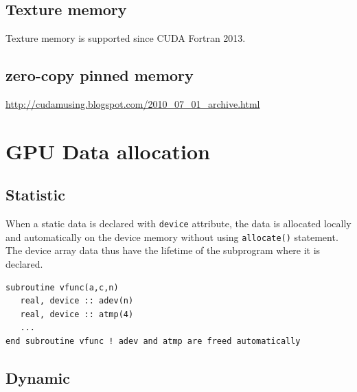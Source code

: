 \subsection{Texture memory}
\label{sec:cudafortran_texture}


Texture memory is supported since CUDA Fortran 2013. 



\subsection{zero-copy pinned memory}
\label{sec:cudaf_zero-copy}

\url{http://cudamusing.blogspot.com/2010_07_01_archive.html}

\section{GPU Data allocation}
\label{sec:cudafortran_data_malloc}

\subsection{Statistic}
\label{sec:statistic}

When a static data is declared with \verb!device! attribute, the data
is allocated locally and automatically on the device memory without
using \verb.allocate(). statement. The device array data thus have the
lifetime of the subprogram where it is declared.
\begin{lstlisting}
subroutine vfunc(a,c,n)
   real, device :: adev(n)
   real, device :: atmp(4)
   ...
end subroutine vfunc ! adev and atmp are freed automatically
\end{lstlisting}

\subsection{Dynamic}
\label{sec:dynamic}


